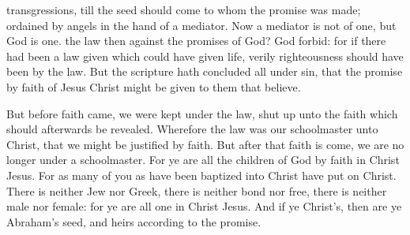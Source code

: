 {transgressions,
till the
seed should
come to
whom the promise was
made;
{}
ordained
by
angels
in the
hand of a
mediator.
Now a
mediator
is
not
{} of
one,
but
God
is
one.
 the
law
then
against the
promises of
God? God
forbid:
for
if there had
been a
law
given
which could
have given
life,
verily
righteousness should have
been
by the
law.
But the
scripture hath
concluded
all
under
sin,
that the
promise
by
faith of
Jesus
Christ might be
given to them
that
believe.
\par }{\PP {}But
before
faith
came, we were
kept
under the
law, shut
up
unto the
faith
which should
afterwards be
revealed.
Wherefore the
law
was
our
schoolmaster
{}
unto
Christ,
that we might be
justified
by
faith.
But after
that
faith is
come, we
are no
longer
under a
schoolmaster.
For ye
are
all the
children of
God
by
faith
in
Christ
Jesus.
For as
many of
you
as have been
baptized
into
Christ have put
on
Christ.
There
is
neither
Jew
nor
Greek, there
is
neither
bond
nor
free, there
is
neither
male
nor
female:
for
ye
are
all
one
in
Christ
Jesus.
And
if
ye
{}
Christ’s,
then are
ye
Abraham’s
seed,
and
heirs according
to the
promise.

}
